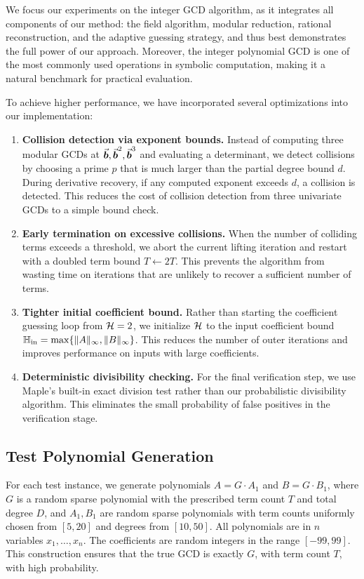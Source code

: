\documentclass{article}
\numberwithin{equation}{section}
\begin{document}
We focus our experiments on the integer GCD algorithm, as it integrates all components of our method: the field algorithm, modular reduction, rational reconstruction, and the adaptive guessing strategy, and thus best demonstrates the full power of our approach. Moreover, the integer polynomial GCD is one of the most commonly used operations in symbolic computation, making it a natural benchmark for practical evaluation.

To achieve higher performance, we have incorporated several optimizations into our implementation:

\begin{enumerate}
    \item \textbf{Collision detection via exponent bounds.} Instead of computing three modular GCDs at $\vec{\boldsymbol{b}}, \vec{\boldsymbol{b}}^2, \vec{\boldsymbol{b}}^3$ and evaluating a determinant, we detect collisions by choosing a prime $p$ that is much larger than the partial degree bound $d$. During derivative recovery, if any computed exponent exceeds $d$, a collision is detected. This reduces the cost of collision detection from three univariate GCDs to a simple bound check.
    
    \item \textbf{Early termination on excessive collisions.} When the number of colliding terms exceeds a threshold, we abort the current lifting iteration and restart with a doubled term bound $T \leftarrow 2T$. This prevents the algorithm from wasting time on iterations that are unlikely to recover a sufficient number of terms.
    
    \item \textbf{Tighter initial coefficient bound.} Rather than starting the coefficient guessing loop from ${\mathcal{H}} = 2$, we initialize ${\mathcal{H}}$ to the input coefficient bound $\mathbb{H}_{\rm in} = \max\{\|A\|_\infty, \|B\|_\infty\}$. This reduces the number of outer iterations and improves performance on inputs with large coefficients.
    
    \item \textbf{Deterministic divisibility checking.} For the final verification step, we use Maple's built-in exact division test rather than our probabilistic divisibility algorithm. This eliminates the small probability of false positives in the verification stage.
\end{enumerate}


\subsection*{Test Polynomial Generation}
For each test instance, we generate polynomials $A = G \cdot A_1$ and $B = G \cdot B_1$, where $G$ is a random sparse polynomial with the prescribed term count $T$ and total degree $D$, and $A_1, B_1$ are random sparse polynomials with term counts uniformly chosen from $[5,20]$ and degrees from $[10,50]$. All polynomials are in $n$ variables $x_1,\dots,x_n$. The coefficients are random integers in the range $[-99, 99]$. This construction ensures that the true GCD is exactly $G$, with term count $T$, with high probability.
\end{document}
